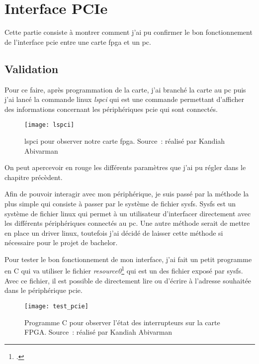 \newpage

\section{Interface PCIe}

Cette partie consiste à montrer comment j'ai pu confirmer le bon fonctionnement de l'interface \gls{pcie} entre une carte \gls{fpga} et un \gls{pc}.

\subsection{Validation}

Pour ce faire, après programmation de la carte, j'ai branché la carte au \gls{pc} puis j'ai lancé la commande linux \textit{lspci} qui est une commande permettant d'afficher des informations concernant les périphériques \gls{pcie} qui sont connectés.

\begin{figure}[tbph!]
	\centering
	\texttt{[image: lspci]}
	\caption[lspci pour observer notre carte FPGA]{lspci pour observer notre carte fpga. Source : réalisé par Kandiah Abivarman}
	\label{fig:lspci}
\end{figure}

On peut apercevoir en rouge les différents paramètres que j'ai pu régler dans le chapitre précèdent.

Afin de pouvoir interagir avec mon périphérique, je suis passé par la méthode la plus simple qui consiste à passer par le système de fichier sysfs.
Sysfs est un système de fichier linux qui permet à un utilisateur d'interfacer directement avec les différents périphériques connectés au \gls{pc}.
Une autre méthode serait de mettre en place un driver linux, toutefois j'ai décidé de laisser cette méthode si nécessaire pour le projet de bachelor.

Pour tester le bon fonctionnement de mon interface, j'ai fait un petit programme en C qui va utiliser le fichier \textit{resource0}\footcite{noauthor_5_nodate} qui est un des fichier exposé par sysfs.
Avec ce fichier, il est possible de directement lire ou d'écrire à l'adresse souhaitée dans le périphérique \gls{pcie}.

\begin{figure}[tbph!]
	\centering
	\texttt{[image: test\_pcie]}
	\caption[Programme C pour observer l'état des interrupteurs sur la carte FPGA]{Programme C pour observer l'état des interrupteurs sur la carte FPGA. Source : réalisé par Kandiah Abivarman}
	\label{fig:test_pcie}
\end{figure}